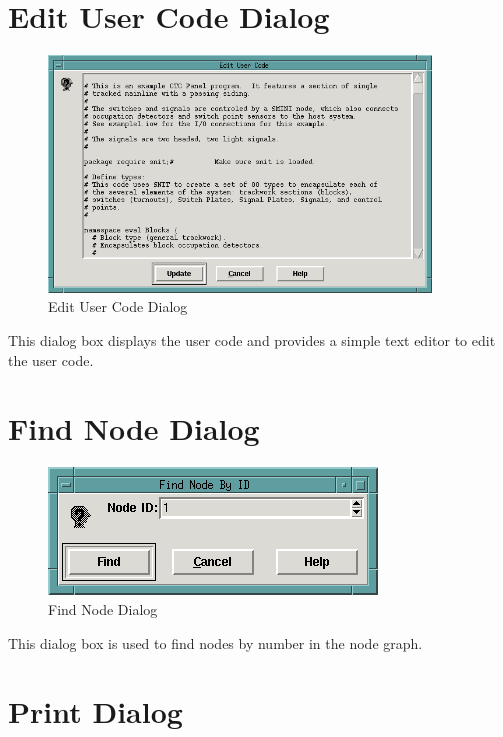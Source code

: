 \section{Edit User Code Dialog}

\begin{figure}[hbpt]
\begin{centering}
\includegraphics[width=4in]{DISPEditUserCode.png}
\caption{Edit User Code Dialog}
\label{fig:dispatcher:editusercodedialog}
\end{centering}
\end{figure}
%
This dialog box displays the user code and provides a simple text editor
to edit the user code.

\section{Find Node Dialog}

\begin{figure}[hbpt]
\begin{centering}
\includegraphics{DISPFindNodeDialog.png}
\caption{Find Node Dialog}
\label{fig:dispatcher:findnodedialog}
\end{centering}
\end{figure}
%
This dialog box is used to find nodes by number in the node graph.

\section{Print Dialog}

